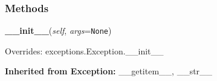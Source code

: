 
  \subsubsection{Methods}

    \label{pipeline:SegmentError:__init__}
    \vspace{0.5ex}

    \noindent\begin{boxedminipage}{\textwidth}

    \raggedright \textbf{\_\_init\_\_}(\textit{self}, \textit{args}=\texttt{N\-o\-n\-e\-})

      Overrides: exceptions.Exception.\_\_init\_\_

    \end{boxedminipage}

  \textbf{Inherited from Exception:}
    \_\_getitem\_\_,
    \_\_str\_\_
